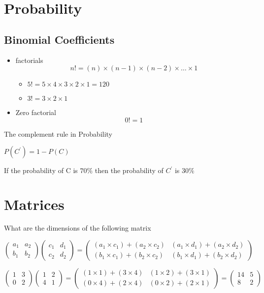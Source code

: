\documentclass{article}
\begin{document}
\section*{Probability}
\subsection*{Binomial Coefficients}
\begin{itemize}
\item factorials 
\[ n! = (n)\times (n-1)\times(n-2) \times \ldots \times 1 \]
\begin{itemize}
\item $5! = 5 \times 4 \times 3 \times 2 \times 1 = 120 $
\item $3! = 3 \times 2 \times 1$
\end{itemize}
\item Zero factorial
\[ 0! =  1 \]
\end{itemize}


The complement rule in Probability

$P(C^{\prime}) = 1- P(C)$

 

If the probability of C is $70 \%$ then the probability of $C^{\prime}$ is $30\%$
\section{Matrices}

What are the dimensions of the following matrix


\[ \left(
\begin{array}{cc}
a_1 & a_2 \\ 
b_1 & b_2
\end{array} \right)\left(
\begin{array}{cc}
c_1 & d_1 \\ 
c_2 & d_2
\end{array} \right) = \left(
\begin{array}{cc}
(a_1 \times c_1) + (a_2 \times c_2) & (a_1 \times d_1) + (a_2 \times d_2) \\ 
(b_1 \times c_1) + (b_2 \times c_2) & (b_1 \times d_1) + (b_2 \times d_2)
\end{array} \right) \]

\bigskip
\large{
\[ \left(
\begin{array}{cc}
1 & 3 \\ 
0 & 2
\end{array} \right)\left(
\begin{array}{cc}
1 & 2 \\ 
4 & 1
\end{array} \right) = \left(
\begin{array}{cc}
(1 \times 1) + (3 \times 4) & (1 \times 2) + (3 \times 1) \\ 
(0 \times 4) + (2 \times 4) & (0 \times 2) + (2 \times 1)
\end{array} \right) = \left(
\begin{array}{cc}
14 & 5 \\ 
8 & 2
\end{array} \right) \]
}
\end{document}
